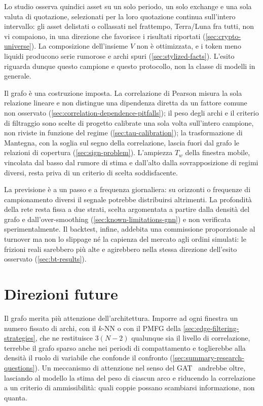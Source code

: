 Lo studio osserva quindici asset su un solo periodo, un solo exchange e una sola valuta di quotazione, selezionati per la loro quotazione continua sull'intero intervallo: gli asset delistati o collassati nel frattempo, Terra/Luna fra tutti, non vi compaiono, in una direzione che favorisce i risultati riportati (\cref{sec:crypto-universe}). La composizione dell'insieme $V$ non è ottimizzata, e i token meno liquidi producono serie rumorose e archi spuri (\cref{sec:stylized-facts}). L'esito riguarda dunque questo campione e questo protocollo, non la classe di modelli in generale.

Il grafo è una costruzione imposta. La correlazione di Pearson misura la sola relazione lineare e non distingue una dipendenza diretta da un fattore comune non osservato (\cref{sec:correlation-dependence-pitfalls}); il peso degli archi e il criterio di filtraggio sono scelte di progetto calibrate una sola volta sull'intero campione, non riviste in funzione del regime (\cref{sec:tau-calibration}); la trasformazione di Mantegna, con la soglia sul segno della correlazione, lascia fuori dal grafo le relazioni di copertura (\cref{sec:sign-problem}). L'ampiezza $T_w$ della finestra mobile, vincolata dal basso dal rumore di stima e dall'alto dalla sovrapposizione di regimi diversi, resta priva di un criterio di scelta soddisfacente.

La previsione è a un passo e a frequenza giornaliera: su orizzonti o frequenze di campionamento diversi il segnale potrebbe distribuirsi altrimenti. La profondità della rete resta fissa a due strati, scelta argomentata a partire dalla densità del grafo e dall'over-smoothing (\cref{sec:known-limitations-gnn}) e non verificata sperimentalmente. Il backtest, infine, addebita una commissione proporzionale al turnover ma non lo slippage né la capienza del mercato agli ordini simulati: le frizioni reali sarebbero più alte e agirebbero nella stessa direzione dell'esito osservato (\cref{sec:bt-results}).

\section{Direzioni future}
\label{sec:future-directions}

Il grafo merita più attenzione dell'architettura. Imporre ad ogni finestra un numero fissato di archi, con il $k$-NN o con il PMFG della \cref{sec:edge-filtering-strategies}, che ne restituisce $3(N-2)$ qualunque sia il livello di correlazione, terrebbe il grafo sparso anche nei periodi di compattamento e toglierebbe alla densità il ruolo di variabile che confonde il confronto (\cref{sec:summary-research-questions}). Un meccanismo di attenzione nel senso del GAT~\cite{velickovic2018gat} andrebbe oltre, lasciando al modello la stima del peso di ciascun arco e riducendo la correlazione a un criterio di ammissibilità: quali coppie possano scambiarsi informazione, non quanta.

